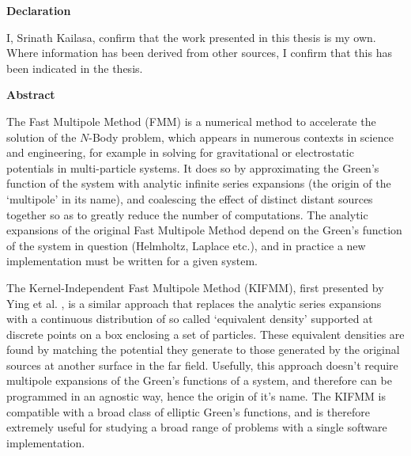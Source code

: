 \thispagestyle{plain}

\begin{center}
    \textbf{Declaration}
\end{center}
I, Srinath Kailasa, confirm that the work presented in this thesis is my own. Where information has been derived from other
sources, I confirm that this has been indicated in the thesis.

\begin{center}
    \textbf{Abstract}
\end{center}

The Fast Multipole Method (\gls{FMM}) is a numerical method to accelerate the solution
of the $N$-Body problem, which appears in numerous contexts in science and engineering,
for example in solving for gravitational or electrostatic potentials in multi-particle
systems. It does so by approximating the Green's function of the
system with analytic infinite series expansions (the origin of the `multipole' in its name),
and coalescing the effect of distinct distant sources together so as to
greatly reduce the number of computations. The analytic expansions of the
original Fast Multipole Method depend on the Green's function of the system in
question (Helmholtz, Laplace etc.), and in practice a new implementation
must be written for a given system.

The Kernel-Independent Fast Multipole Method (\gls{KIFMM}),
first presented by Ying et al. \cite{Ying:2004:JCP}, is a similar approach that replaces
the analytic series expansions with a continuous distribution of so called
`equivalent density' supported at discrete points on a box enclosing a set of
particles. These equivalent densities are found by matching the potential they
generate to those generated by the original sources at another surface in the
far field. Usefully, this approach doesn't require multipole expansions of the
Green's functions of a system, and therefore can be programmed in an agnostic way,
hence the origin of it's name. The KIFMM is compatible with a broad class of
elliptic Green's functions, and is therefore extremely useful for studying a broad
range of problems with a single software implementation.

